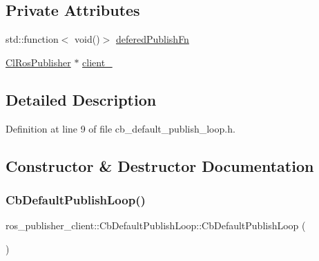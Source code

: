 \subsection*{Private Attributes}
\begin{DoxyCompactItemize}
\item 
std\+::function$<$ void()$>$ \hyperlink{classros__publisher__client_1_1CbDefaultPublishLoop_a321f79f015449668a184cd30b6c2ad51}{defered\+Publish\+Fn}
\item 
\hyperlink{classros__publisher__client_1_1ClRosPublisher}{Cl\+Ros\+Publisher} $\ast$ \hyperlink{classros__publisher__client_1_1CbDefaultPublishLoop_a90fc344876c742774a73542e338c3bfd}{client\+\_\+}
\end{DoxyCompactItemize}


\subsection{Detailed Description}


Definition at line 9 of file cb\+\_\+default\+\_\+publish\+\_\+loop.\+h.



\subsection{Constructor \& Destructor Documentation}
\mbox{\label{classros__publisher__client_1_1CbDefaultPublishLoop_adef5a847465f4c7f399a25ce37ab2fe5}} 
\subsubsection{\texorpdfstring{Cb\+Default\+Publish\+Loop()}{CbDefaultPublishLoop()}\hspace{0.1cm}{\footnotesize\ttfamily [1/2]}}
{\footnotesize\ttfamily ros\+\_\+publisher\+\_\+client\+::\+Cb\+Default\+Publish\+Loop\+::\+Cb\+Default\+Publish\+Loop (\begin{DoxyParamCaption}{ }\end{DoxyParamCaption})\hspace{0.3cm}{\ttfamily [inline]}}



